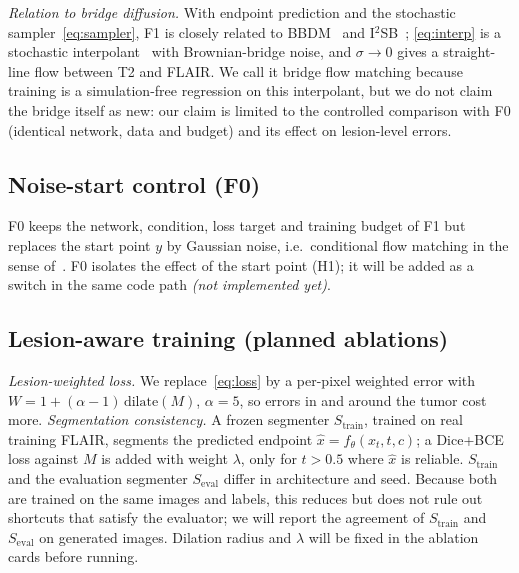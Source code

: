 \documentclass[journal]{IEEEtran}
\newcommand{\Seval}{S_{\mathrm{eval}}}
\newcommand{\Strain}{S_{\mathrm{train}}}
\begin{document}
\emph{Relation to bridge diffusion.} With endpoint prediction and the stochastic sampler~\eqref{eq:sampler}, F1 is closely
related to BBDM~\cite{li2023bbdm} and I$^2$SB~\cite{liu2023i2sb}; \eqref{eq:interp} is a stochastic
interpolant~\cite{albergo2023interpolants,albergo2025unifying} with Brownian-bridge noise, and $\sigma\to0$ gives a
straight-line flow between T2 and FLAIR. We call it bridge flow matching because training is a simulation-free regression on
this interpolant, but we do not claim the bridge itself as new: our claim is limited to the controlled comparison with F0
(identical network, data and budget) and its effect on lesion-level errors.

\subsection{Noise-start control (F0)}
F0 keeps the network, condition, loss target and training budget of F1 but replaces the start point $y$ by Gaussian
noise, i.e.\ conditional flow matching in the sense of~\cite{lipman2023flowmatching}. F0 isolates the effect of the start point
(H1); it will be added as a switch in the same code path \emph{(not implemented yet)}.

\subsection{Lesion-aware training (planned ablations)}
\emph{Lesion-weighted loss.} We replace~\eqref{eq:loss} by a per-pixel weighted error with
$W=1+(\alpha-1)\,\mathrm{dilate}(M)$, $\alpha=5$, so errors in and around the tumor cost more.
\emph{Segmentation consistency.} A frozen segmenter $\Strain$, trained on real training FLAIR, segments the predicted
endpoint $\hat x=f_\theta(x_t,t,c)$; a Dice+BCE loss against $M$ is added with weight $\lambda$, only for $t>0.5$ where
$\hat x$ is reliable. $\Strain$ and the evaluation segmenter $\Seval$ differ in architecture and seed. Because both are trained on the same images and labels, this reduces but does not rule out shortcuts that satisfy the evaluator; we will report the agreement of $\Strain$ and $\Seval$ on generated images. Dilation radius and $\lambda$ will be fixed in the ablation cards before running.
\end{document}
